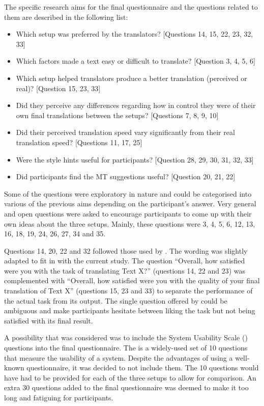 The specific research aims for the final questionnaire and the questions related to them are described in the following list:

\begin{itemize}
\item Which setup was preferred by the translators? [Questions 14, 15, 22, 23, 32, 33]
\item Which factors made a text easy or difficult to translate? [Question 3, 4, 5, 6]
\item Which setup helped translators produce a better translation (perceived or real)? [Question 15, 23, 33]
\item Did they perceive any differences regarding how in control they were of their own final translations between the setups? [Questions 7, 8, 9, 10]
\item Did their perceived translation speed vary significantly from their real translation speed? [Questions 11, 17, 25]
\item Were the style hints useful for participants? [Question 28, 29, 30, 31, 32, 33]
\item Did participants find the \ac{MT} suggestions useful? [Question 20, 21, 22]
\end{itemize}

Some of the questions were exploratory in nature and could be categorised into various of the previous aims depending on the participant's answer. Very general and open questions were asked to encourage participants to come up with their own ideas about the three setups. Mainly, these questions were 3, 4, 5, 6, 12, 13, 16, 18, 19, 24, 26, 27, 34 and 35.

Questions 14, 20, 22 and 32 followed those used by \textcite{carl2015post}. The wording was slightly adapted to fit in with the current study. The question ``Overall, how satisfied were you with the task of translating Text X?'' (questions 14, 22 and 23) was complemented with ``Overall, how satisfied were you with the quality of your final translation of Text X'' (questions 15, 23 and 33) to separate the performance of the actual task from its output. The single question offered by \textcite{carl2015post} could be ambiguous and make participants hesitate between liking the task but not being satisfied with its final result.

A possibility that was considered was to include the System Usability Scale () \parencite{brooke1996sus} questions into the final questionnaire. The  is a widely-used set of 10 questions that measure the usability of a system. Despite the advantages of using a well-known questionnaire, it was decided to not include them. The 10 questions would have had to be provided for each of the three setups to allow for comparison. An extra 30 questions added to the final questionnaire was deemed to make it too long and fatiguing for participants.


